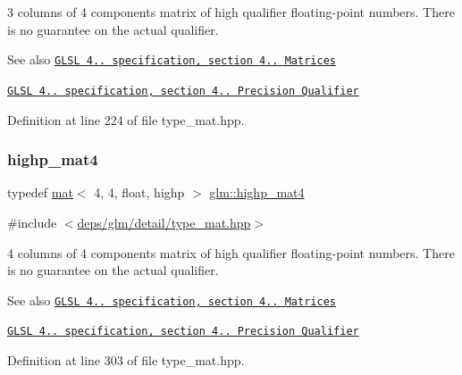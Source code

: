 3 columns of 4 components matrix of high qualifier floating-\/point numbers. There is no guarantee on the actual qualifier.

\begin{DoxySeeAlso}{See also}
\href{http://www.opengl.org/registry/doc/GLSLangSpec.4.20.8.pdf}{\tt G\+L\+SL 4.. specification, section 4.. Matrices} 

\href{http://www.opengl.org/registry/doc/GLSLangSpec.4.20.8.pdf}{\tt G\+L\+SL 4.. specification, section 4.. Precision Qualifier} 
\end{DoxySeeAlso}


Definition at line 224 of file type\+\_\+mat.\+hpp.

\mbox{\label{group__core__precision_gab46132805773d55f00fce859bc71e799}} 
\subsubsection{\texorpdfstring{highp\+\_\+mat4}{highp\_mat4}}
{\footnotesize\ttfamily typedef \hyperlink{structglm_1_1mat}{mat}$<$ 4, 4, float, highp $>$ \hyperlink{group__core__precision_gab46132805773d55f00fce859bc71e799}{glm\+::highp\+\_\+mat4}}



{\ttfamily \#include $<$\hyperlink{type__mat_8hpp}{deps/glm/detail/type\+\_\+mat.\+hpp}$>$}

4 columns of 4 components matrix of high qualifier floating-\/point numbers. There is no guarantee on the actual qualifier.

\begin{DoxySeeAlso}{See also}
\href{http://www.opengl.org/registry/doc/GLSLangSpec.4.20.8.pdf}{\tt G\+L\+SL 4.. specification, section 4.. Matrices} 

\href{http://www.opengl.org/registry/doc/GLSLangSpec.4.20.8.pdf}{\tt G\+L\+SL 4.. specification, section 4.. Precision Qualifier} 
\end{DoxySeeAlso}


Definition at line 303 of file type\+\_\+mat.\+hpp.

\mbox{\label{group__core__precision_ga0355949c79024224f7e9cfa06bc82153}} 
